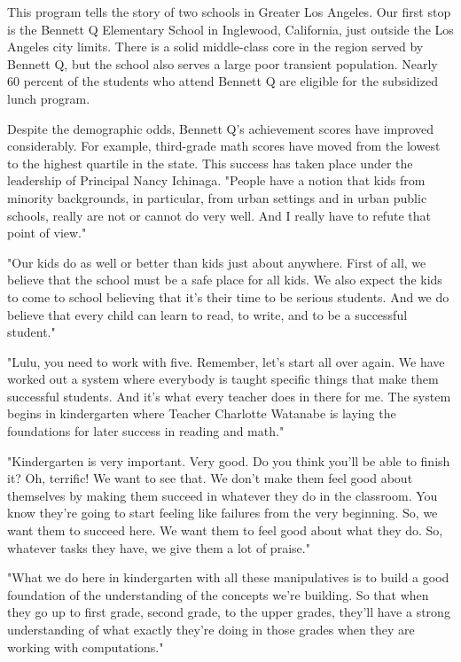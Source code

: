 This program tells the story of two schools in Greater Los Angeles. Our first stop is the Bennett Q Elementary School in Inglewood, California, just outside the Los Angeles city limits. There is a solid middle-class core in the region served by Bennett Q, but the school also serves a large poor transient population. Nearly 60 percent of the students who attend Bennett Q are eligible for the subsidized lunch program.

Despite the demographic odds, Bennett Q's achievement scores have improved considerably. For example, third-grade math scores have moved from the lowest to the highest quartile in the state. This success has taken place under the leadership of Principal Nancy Ichinaga. "People have a notion that kids from minority backgrounds, in particular, from urban settings and in urban public schools, really are not or cannot do very well. And I really have to refute that point of view."

"Our kids do as well or better than kids just about anywhere. First of all, we believe that the school must be a safe place for all kids. We also expect the kids to come to school believing that it's their time to be serious students. And we do believe that every child can learn to read, to write, and to be a successful student."

"Lulu, you need to work with five. Remember, let's start all over again. We have worked out a system where everybody is taught specific things that make them successful students. And it's what every teacher does in there for me. The system begins in kindergarten where Teacher Charlotte Watanabe is laying the foundations for later success in reading and math."

"Kindergarten is very important. Very good. Do you think you'll be able to finish it? Oh, terrific! We want to see that. We don't make them feel good about themselves by making them succeed in whatever they do in the classroom. You know they're going to start feeling like failures from the very beginning. So, we want them to succeed here. We want them to feel good about what they do. So, whatever tasks they have, we give them a lot of praise."

"What we do here in kindergarten with all these manipulatives is to build a good foundation of the understanding of the concepts we're building. So that when they go up to first grade, second grade, to the upper grades, they'll have a strong understanding of what exactly they're doing in those grades when they are working with computations."

